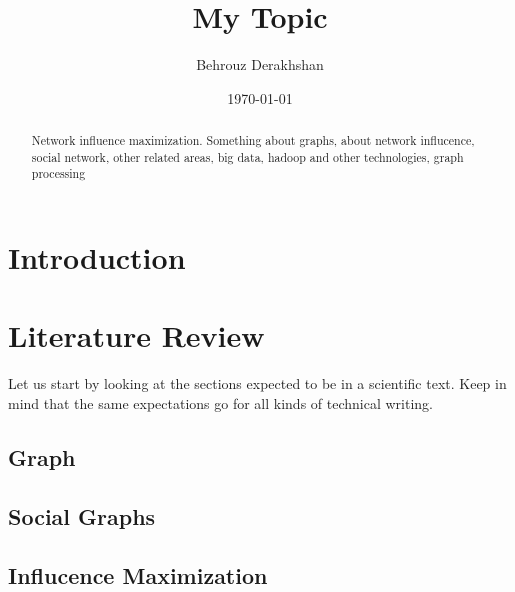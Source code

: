\documentclass[english]{tktltiki}
\begin{document}
\onehalfspacing

\title{My Topic}
\author{Behrouz Derakhshan}
\date{\today}

\maketitle



\begin{abstract}

Network influence maximization. Something about graphs, about network influcence, social network, other related areas, big data, hadoop and other technologies, graph processing

\end{abstract}

\mytableofcontents




\section{Introduction}




\section{Literature Review}

Let us start by looking at the sections expected to be in a scientific text. Keep in mind that the same expectations go for all kinds of technical writing.

\subsection{Graph}




\subsection{Social Graphs}




\subsection{Influcence Maximization}
\end{document}
